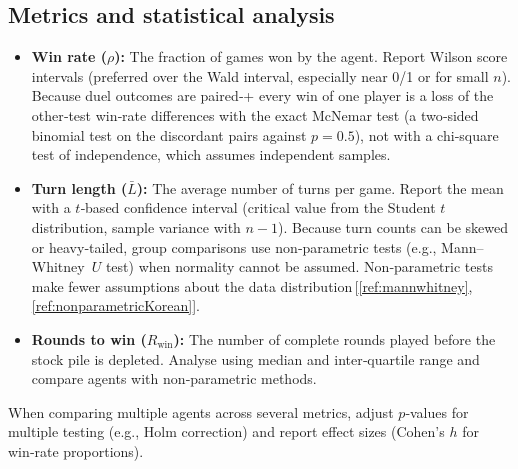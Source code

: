 \documentclass[11pt]{article}
\begin{document}
\subsection{Metrics and statistical analysis}
\begin{itemize}
\item \textbf{Win rate ($\rho$):} The fraction of games won by the agent. Report Wilson score intervals (preferred over the Wald interval, especially near 0/1 or for small $n$). Because duel outcomes are paired‑+ every win of one player is a loss of the other‑test win‑rate differences with the exact McNemar test (a two‑sided binomial test on the discordant pairs against $p=0.5$), not with a chi‑square test of independence, which assumes independent samples.
\item \textbf{Turn length ($\bar{L}$):} The average number of turns per game. Report the mean with a $t$‑based confidence interval (critical value from the Student $t$ distribution, sample variance with $n-1$). Because turn counts can be skewed or heavy‑tailed, group comparisons use non‑parametric tests (e.g., Mann–Whitney $U$ test) when normality cannot be assumed. Non‑parametric tests make fewer assumptions about the data distribution\,[\ref{ref:mannwhitney},\,\ref{ref:nonparametricKorean}].
\item \textbf{Rounds to win ($R_{\text{win}}$):} The number of complete rounds played before the stock pile is depleted. Analyse using median and inter‑quartile range and compare agents with non‑parametric methods.
\end{itemize}
When comparing multiple agents across several metrics, adjust $p$‑values for multiple testing (e.g., Holm correction) and report effect sizes (Cohen's $h$ for win‑rate proportions).
\end{document}
